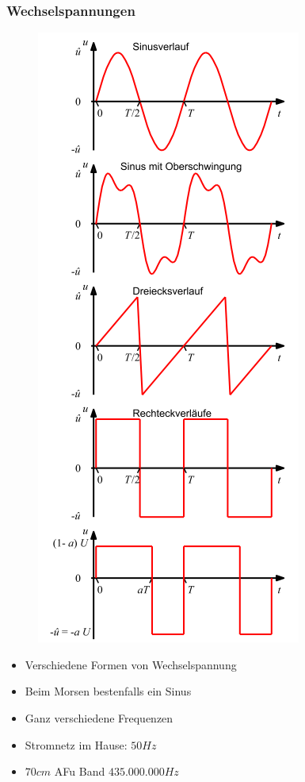 \begin{frame}
  \frametitle{Wechselspannungen}
  \begin{minipage}{0.4\textwidth}
    \begin{figure}
      \includegraphics[width=.5\textwidth,height=.75\textheight,keepaspectratio]{e02/Wechselspannungsformen.png}
    \end{figure}
  \end{minipage}
  \begin{minipage}{0.4\textwidth}
    \begin{itemize}
      \item Verschiedene Formen von Wechselspannung
      \item Beim Morsen bestenfalls ein Sinus
      \item Ganz verschiedene Frequenzen
      \item Stromnetz im Hause: $50Hz$
      \item $70cm$ AFu Band $435.000.000Hz$
    \end{itemize}
  \end{minipage}
\end{frame}

